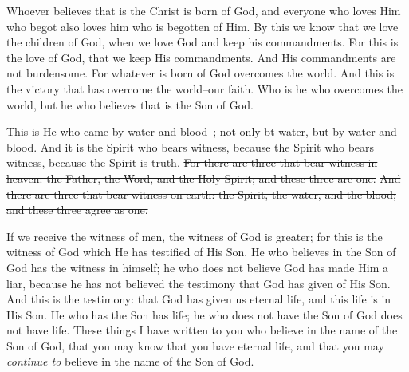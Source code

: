 
\bverse Whoever believes that  is the Christ is born of God, and everyone who loves Him who begot also loves him who is begotten of Him.
\bverse By this we know that we love the children of God, when we love God and keep his commandments.
\bverse For this is the love of God, that we keep His commandments. And His commandments are not burdensome.
\bverse For whatever is born of God overcomes the world. And this is the victory that has overcome the world--our faith.
\bverse Who is he who overcomes the world, but he who believes that  is the Son of God.
	
	
\bverse This is He who came by water and blood--; not only bt water, but by water and blood. And it is the Spirit who bears witness, because the Spirit who bears witness, because the Spirit is truth.
\bverse \st{For there are three that bear witness in heaven: the Father, the Word, and the Holy Spirit; and these three are one.}
\bverse \st{And there are three that bear witness on earth: the Spirit, the water, and the blood; and these three agree as one.}
	
\bverse If we receive the witness of men, the witness of God is greater; for this is the witness of God which He has testified of His Son.
\bverse He who believes in the Son of God has the witness in himself; he who does not believe God has made Him a liar, because he has not believed the testimony that God has given of His Son.
\bverse And this is the testimony: that God has given us eternal life, and this life is in His Son.
\bverse He who has the Son has life; he who does not have the Son of God does not have life.
\bverse These things I have written to you who believe in the name of the Son of God, that you may know that you have eternal life, and that you may \textit{continue to} believe in the name of the Son of God.

